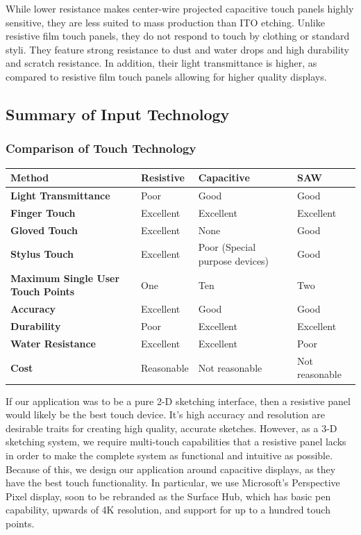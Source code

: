 \documentclass[11pt]{report}
\begin{document}
While lower resistance makes center-wire projected capacitive touch panels highly sensitive, they are less suited to mass production than ITO etching.
Unlike resistive film touch panels, they do not respond to touch by clothing or standard styli.
They feature strong resistance to dust and water drops and high durability and scratch resistance. 
In addition, their light transmittance is higher, as compared to resistive film touch panels allowing for higher quality displays.

\subsection{Summary of Input Technology}

\subsubsection{Comparison of Touch Technology}
\begin{center}
\begin{tabular}{| p{5cm} | l | p{4cm} | l |}
\hline
\textbf{Method} & \textbf{Resistive} & \textbf{Capacitive} & \textbf{SAW} \\ \hline
\textbf{Light Transmittance} & Poor & Good & Good \\ \hline
\textbf{Finger Touch} & Excellent & Excellent & Excellent \\ \hline
\textbf{Gloved Touch} & Excellent & None & Good \\ \hline
\textbf{Stylus Touch} & Excellent & Poor (Special purpose devices) & Good \\ \hline
\textbf{Maximum Single User Touch Points} & One & Ten & Two \\ \hline
\textbf{Accuracy} & Excellent & Good & Good \\ \hline
\textbf{Durability} & Poor & Excellent & Excellent \\ \hline
\textbf{Water Resistance} & Excellent & Excellent & Poor \\ \hline
\textbf{Cost} & Reasonable & Not reasonable & Not reasonable \\ \hline
\end{tabular}
\end{center}

If our application was to be a pure 2-D sketching interface, then a resistive panel would likely be the best touch device.
It's high accuracy and resolution are desirable traits for creating high quality, accurate sketches.
However, as a 3-D sketching system, we require multi-touch capabilities that a resistive panel lacks in order to make the complete system as functional and intuitive as possible.
Because of this, we design our application around capacitive displays, as they have the best touch functionality.
In particular, we use Microsoft's Perspective Pixel display, soon to be rebranded as the Surface Hub, which has basic pen capability, upwards of 4K resolution, and support for up to a hundred touch points.
\end{document}
